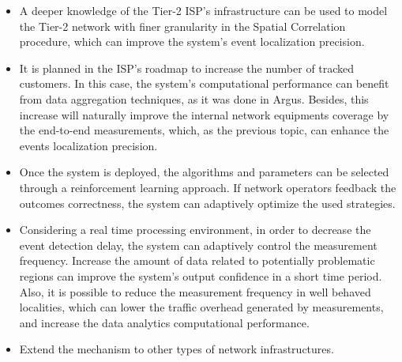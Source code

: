 \begin{itemize}
\item
A deeper knowledge of the Tier-2 ISP's infrastructure
can be used to model the Tier-2 network with finer granularity in the Spatial
Correlation procedure, which can improve the system's event localization
precision.

\item
It is planned in the ISP's roadmap to increase the number of tracked customers.
In this case, the system's computational performance can benefit from data
aggregation techniques, as it was done in Argus.
Besides, this increase will naturally improve the internal network equipments
coverage by the end-to-end measurements, which, as the previous topic, can
enhance the events localization precision.

\item
Once the system is deployed, the algorithms and parameters can be selected
through a reinforcement learning approach. If network operators
feedback the outcomes correctness, the system can adaptively optimize the used
strategies.

\item
Considering a real time processing environment, in order to decrease the
event detection delay, the system can adaptively control the measurement
frequency.
Increase the amount of data related to potentially problematic regions
can improve the system's output confidence in a short time period.
Also, it is possible to reduce the measurement frequency in well behaved
localities, which can lower the traffic overhead generated by measurements, and
increase the data analytics computational performance.

\item
Extend the mechanism to other types of network infrastructures.

\end{itemize}

